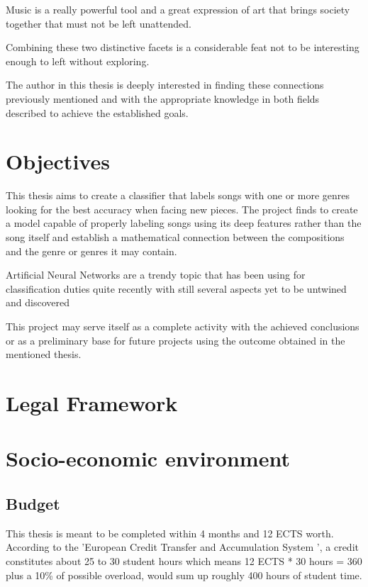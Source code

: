 Music is a really powerful tool and a great expression of art that brings society together that must not be left unattended.

Combining these two distinctive facets is a considerable feat not to be interesting enough to left without exploring.

The author in this thesis is deeply interested in finding these connections previously mentioned and with the appropriate knowledge in both fields described to achieve the established goals.
\newpage

\section{Objectives}
This thesis aims to create a classifier that labels songs with one or more genres looking for the best accuracy when facing new pieces. The project finds to create a model capable of properly labeling songs using its deep features rather than the song itself and establish a mathematical connection between the compositions and the genre or genres it may contain.

Artificial Neural Networks are a trendy topic that has been using for classification duties quite recently with still several aspects yet to be untwined and discovered

This project may serve itself as a complete activity with the achieved conclusions or as a preliminary base for future projects using the outcome obtained in the mentioned thesis.

\newpage
\section{Legal Framework}


\section{Socio-economic environment}
\subsection{Budget}

This thesis is meant to be completed within 4 months and 12 ECTS worth. 
According to the 'European Credit Transfer and Accumulation System \cite{ects}', a credit constitutes about 25 to 30 student hours which means 12 ECTS * 30 hours = 360 plus a 10\% of possible overload, would sum up roughly 400 hours of student time.

